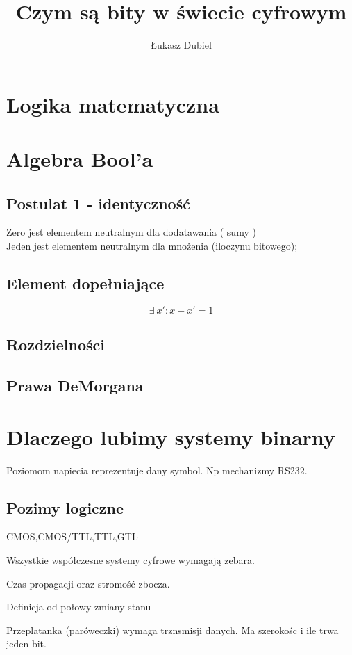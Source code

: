\documentclass{article}
\title{Czym są bity w świecie cyfrowym}
\author{Łukasz Dubiel}
\begin{document}
\maketitle

\section{Logika matematyczna}

\section{Algebra Bool'a}
\subsection{Postulat 1 - identyczność}
Zero jest elementem neutralnym dla dodatawania ( sumy ) \\
Jeden jest elementem neutralnym dla mnożenia (iloczynu bitowego);
\subsection{Element dopełniające}
\begin{displaymath}
\exists\ {x'} : x + x' = 1
\end{displaymath}
\subsection{Rozdzielności}
\subsection{Prawa DeMorgana}
\section{Dlaczego lubimy systemy binarny}
Poziomom napiecia reprezentuje dany symbol.
Np mechanizmy RS232.
\subsection{Pozimy logiczne}
CMOS,CMOS/TTL,TTL,GTL
\bigskip

Wszystkie współczesne systemy cyfrowe wymagają zebara.

Czas propagacji oraz stromość zbocza.

Definicja od połowy zmiany stanu

Przeplatanka (paróweczki) wymaga trznsmisji danych.
Ma szerokośc i ile trwa jeden bit.
\end{document}
